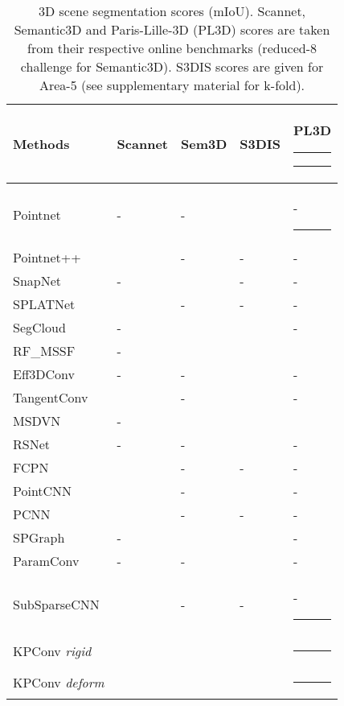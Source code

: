 \documentclass[10pt,twocolumn,letterpaper]{article}
\newcommand\Tstrut{\rule{-3pt}{2.6ex}}       \newcommand\Bstrut{\rule[-0.9ex]{-3pt}{0pt}} \newcommand{\TBstrut}{\rule{-3pt}{2.6ex} \rule[-0.9ex]{-2pt}{0pt}}
\begin{document}
\begin{table}[!t]
\setlength\tabcolsep{0.5pt}
\begin{center}
\begin{tabular}{ L{2.8cm} C{1.3cm}  C{1.3cm} C{1.3cm} C{1.3cm}}
\hline
Methods & Scannet & Sem3D & S3DIS & PL3D \TBstrut\\
\hline

Pointnet \cite{qi2017pointnet}	            & - & - &  & - \Tstrut\\
Pointnet++ \cite{qi2017pointnet++}	        &  & - & - & - \\
SnapNet \cite{boulch2017unstructured}	    & - &  & - & - \\
SPLATNet \cite{su2018splatnet}	            &  & - & - & - \\
SegCloud \cite{tchapmi2017segcloud}	        & - &  &  & -\\
RF\_MSSF \cite{thomas2018semantic}	        & - &  &  &  \\
Eff3DConv \cite{zhang2018efficient}	        & - & - &  & -\\
TangentConv \cite{tatarchenko2018tangent}	&  & - &  & -\\
MSDVN \cite{roynard2018classification}      & - &  &  & 	\\
RSNet \cite{huang2018recurrent}             & - & - &  & -	\\
FCPN \cite{rethage2018fully}	            &  & - & - & - \\
PointCNN \cite{li2018pointcnn}	            &  & - &  & - \\
PCNN \cite{atzmon2018point}	                &  & - & - & -\\
SPGraph \cite{landrieu2018large}	        & - &  &  & -	\\
ParamConv \cite{wang2018deep}	            & - & - &  & -  \\
SubSparseCNN \cite{graham20183d}	        &  & - & - & - \Bstrut\\
\hline
KPConv \textit{rigid} &  & 	&  &  \Tstrut\\
KPConv \textit{deform} &  & 	&  &  \Bstrut\\
\hline
\end{tabular}
\end{center}
\caption{3D scene segmentation scores (mIoU). Scannet, Semantic3D and Paris-Lille-3D (PL3D) scores are taken from their respective online benchmarks (reduced-8 challenge for Semantic3D). S3DIS scores are given for Area-5 (see supplementary material for k-fold).}
\label{Table_Semantic3D}
\vspace{-3ex}
\end{table}
\end{document}
